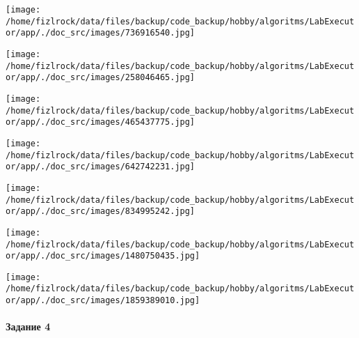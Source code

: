\documentclass[a4paper, 12pt]{article}
\begin{document}
\texttt{[image: /home/fizlrock/data/files/backup/code\_backup/hobby/algoritms/LabExecutor/app/./doc\_src/images/736916540.jpg]}

\texttt{[image: /home/fizlrock/data/files/backup/code\_backup/hobby/algoritms/LabExecutor/app/./doc\_src/images/258046465.jpg]}

\texttt{[image: /home/fizlrock/data/files/backup/code\_backup/hobby/algoritms/LabExecutor/app/./doc\_src/images/465437775.jpg]}

\texttt{[image: /home/fizlrock/data/files/backup/code\_backup/hobby/algoritms/LabExecutor/app/./doc\_src/images/642742231.jpg]}

\texttt{[image: /home/fizlrock/data/files/backup/code\_backup/hobby/algoritms/LabExecutor/app/./doc\_src/images/834995242.jpg]}

\texttt{[image: /home/fizlrock/data/files/backup/code\_backup/hobby/algoritms/LabExecutor/app/./doc\_src/images/1480750435.jpg]}

\texttt{[image: /home/fizlrock/data/files/backup/code\_backup/hobby/algoritms/LabExecutor/app/./doc\_src/images/1859389010.jpg]}
\pagebreak
\paragraph{Задание 4}
\end{document}
